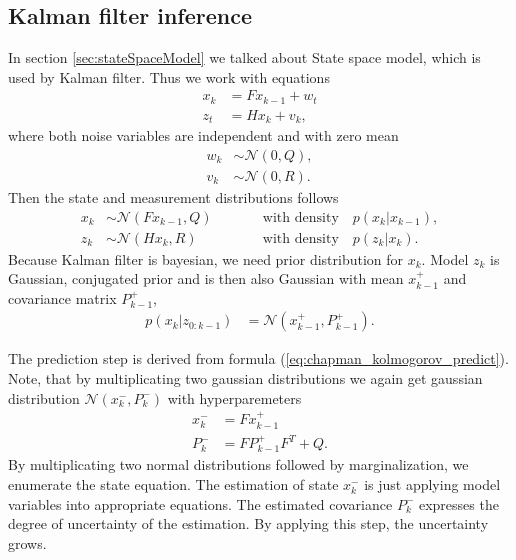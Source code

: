 \subsection{Kalman filter inference}
In section \ref{sec:stateSpaceModel} we talked about State space model, which is used by Kalman filter. Thus we work
with equations
\begin{align}
    x_k &= Fx_{k-1} + w_t \\
    z_t &= Hx_k + v_k,
\end{align}
where both noise variables are independent and with zero mean
\begin{align}
    w_k &\sim \mathcal{N}(0,Q), \\
    v_k &\sim \mathcal{N}(0,R).
\end{align}
Then the state and measurement distributions follows
\begin{align}
    x_k &\sim \mathcal{N}(Fx_{k-1},Q) \qquad && \text{with density}\quad p(x_k|x_{k-1}), \\
    z_k &\sim  \mathcal{N}(Hx_k,R) \qquad && \text{with density}\quad p(z_k|x_k).
\end{align}
Because Kalman filter is bayesian, we need prior distribution for $x_k$. Model $z_k$ is Gaussian, conjugated prior and
is then also Gaussian with mean $x_{k-1}^+$ and covariance matrix $P_{k-1}^+$,
\begin{align}
    p(x_k|z_{0:k-1}) &= \mathcal{N}(x_{k-1}^+,P_{k-1}^+).
\end{align}

The prediction step is derived from formula (\ref{eq:chapman_kolmogorov_predict}). Note, that by multiplicating two
gaussian distributions we again get gaussian distribution $\mathcal{N}(x_k^-,P_k^-)$ with hyperparemeters
\begin{align}
    x_k^- &= Fx_{k-1}^+ \\
    P_k^- &= FP_{k-1}^{+}F^T + Q.
\end{align}
By multiplicating two normal distributions followed by marginalization, we enumerate the state equation. The estimation
of state $x_k^-$ is just applying model variables into appropriate equations. The estimated covariance $P_k^-$
expresses the degree of uncertainty of the estimation. By applying this step, the uncertainty grows.


